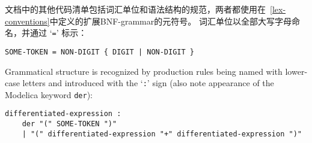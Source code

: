 文档中的其他代码清单包括词汇单位和语法结构的规范，两者都使用在~\cref{lex-conventions}中定义的扩展BNF-grammar的元符号。
词汇单位以全部大写字母命名，并通过 `\lstinline[language=grammar]!=!' 标示：
\begin{lstlisting}[language=grammar]
SOME-TOKEN = NON-DIGIT { DIGIT | NON-DIGIT }
\end{lstlisting}
Grammatical structure is recognized by production rules being named with lower-case letters and introduced with the `\lstinline[language=grammar]!:!' sign (also note appearance of the Modelica keyword \lstinline!der!):
\begin{lstlisting}[language=grammar]
differentiated-expression :
    der "(" SOME-TOKEN ")"
    | "(" differentiated-expression "+" differentiated-expression ")"
\end{lstlisting}
